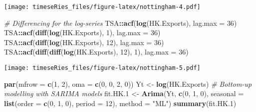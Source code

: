 \documentclass[]{book}
\newenvironment{Shaded}{\begin{snugshade}}{\end{snugshade}}
\newcommand{\CommentTok}[1]{\textcolor[rgb]{0.56,0.35,0.01}{\textit{#1}}}
\newcommand{\DataTypeTok}[1]{\textcolor[rgb]{0.13,0.29,0.53}{#1}}
\newcommand{\DecValTok}[1]{\textcolor[rgb]{0.00,0.00,0.81}{#1}}
\newcommand{\FloatTok}[1]{\textcolor[rgb]{0.00,0.00,0.81}{#1}}
\newcommand{\KeywordTok}[1]{\textcolor[rgb]{0.13,0.29,0.53}{\textbf{#1}}}
\newcommand{\NormalTok}[1]{#1}
\newcommand{\OperatorTok}[1]{\textcolor[rgb]{0.81,0.36,0.00}{\textbf{#1}}}
\newcommand{\StringTok}[1]{\textcolor[rgb]{0.31,0.60,0.02}{#1}}
\begin{document}
\texttt{[image: timeseRies\_files/figure-latex/nottingham-4.pdf]}

\begin{Shaded}
\begin{Highlighting}[]
\CommentTok{# Differencing for the log-series}
\NormalTok{TSA}\OperatorTok{::}\KeywordTok{acf}\NormalTok{(}\KeywordTok{log}\NormalTok{(HK.Exports), }\DataTypeTok{lag.max =} \DecValTok{36}\NormalTok{)}
\NormalTok{TSA}\OperatorTok{::}\KeywordTok{acf}\NormalTok{(}\KeywordTok{diff}\NormalTok{(}\KeywordTok{log}\NormalTok{(HK.Exports), }\DecValTok{1}\NormalTok{), }\DataTypeTok{lag.max =} \DecValTok{36}\NormalTok{)}
\NormalTok{TSA}\OperatorTok{::}\KeywordTok{acf}\NormalTok{(}\KeywordTok{diff}\NormalTok{(}\KeywordTok{log}\NormalTok{(HK.Exports), }\DecValTok{12}\NormalTok{), }\DataTypeTok{lag.max =} \DecValTok{36}\NormalTok{)}
\NormalTok{TSA}\OperatorTok{::}\KeywordTok{acf}\NormalTok{(}\KeywordTok{diff}\NormalTok{(}\KeywordTok{diff}\NormalTok{(}\KeywordTok{log}\NormalTok{(HK.Exports), }\DecValTok{12}\NormalTok{), }\DecValTok{1}\NormalTok{), }\DataTypeTok{lag.max =} \DecValTok{36}\NormalTok{)}
\end{Highlighting}
\end{Shaded}

\texttt{[image: timeseRies\_files/figure-latex/nottingham-5.pdf]}

\begin{Shaded}
\begin{Highlighting}[]
\KeywordTok{par}\NormalTok{(}\DataTypeTok{mfrow =} \KeywordTok{c}\NormalTok{(}\DecValTok{1}\NormalTok{, }\DecValTok{2}\NormalTok{), }\DataTypeTok{oma =} \KeywordTok{c}\NormalTok{(}\DecValTok{0}\NormalTok{, }\DecValTok{0}\NormalTok{, }\DecValTok{2}\NormalTok{, }\DecValTok{0}\NormalTok{))}
\NormalTok{Yt <-}\StringTok{ }\KeywordTok{log}\NormalTok{(HK.Exports)}
\CommentTok{# Bottom-up modelling with SARIMA models}
\NormalTok{fit.HK}\FloatTok{.1}\NormalTok{ <-}\StringTok{ }\KeywordTok{Arima}\NormalTok{(Yt, }\KeywordTok{c}\NormalTok{(}\DecValTok{0}\NormalTok{, }\DecValTok{1}\NormalTok{, }\DecValTok{0}\NormalTok{), }\DataTypeTok{seasonal =} \KeywordTok{list}\NormalTok{(}\DataTypeTok{order =} \KeywordTok{c}\NormalTok{(}\DecValTok{0}\NormalTok{, }\DecValTok{1}\NormalTok{, }\DecValTok{0}\NormalTok{), }\DataTypeTok{period =} \DecValTok{12}\NormalTok{), }
    \DataTypeTok{method =} \StringTok{"ML"}\NormalTok{)}
\KeywordTok{summary}\NormalTok{(fit.HK}\FloatTok{.1}\NormalTok{)}
\end{Highlighting}
\end{Shaded}
\end{document}

